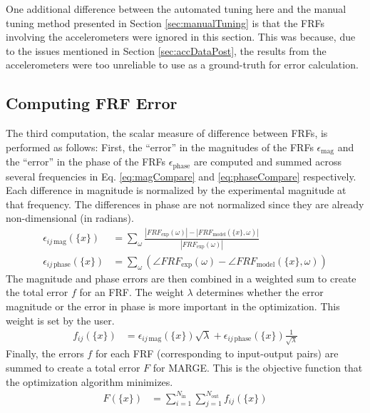 One additional difference between the automated tuning here and the manual tuning method presented in Section \ref{sec:manualTuning} is that the FRFs involving the accelerometers were ignored in this section. This was because, due to the issues mentioned in Section \ref{sec:accDataPost}, the results from the accelerometers were too unreliable to use as a ground-truth for error calculation.

\subsection{Computing FRF Error} %

The third computation, the scalar measure of difference between FRFs, is performed as follows:
First, the ``error'' in the magnitudes of the FRFs $\epsilon_\text{mag}$ and the ``error'' in the phase of the FRFs $\epsilon_\text{phase}$ are computed and summed across several frequencies in Eq. \ref{eq:magCompare} and \ref{eq:phaseCompare} respectively. Each difference in magnitude is normalized by the experimental magnitude at that frequency. The differences in phase are not normalized since they are already non-dimensional (in radians).
\begin{align}
	\label{eq:magCompare}
	\epsilon_{ij \, \text{mag}}(\{x\}) &= \sum_\omega \frac{|FRF_\text{exp} (\omega)| - |FRF_\text{model}(\{x\},\omega)|}{|FRF_\text{exp} (\omega)|} \\
	\label{eq:phaseCompare}
	\epsilon_{ij \, \text{phase}}(\{x\}) &= \sum_\omega \left( \angle FRF_\text{exp} (\omega) - \angle FRF_\text{model}(\{x\},\omega) \right)
\end{align}
The magnitude and phase errors are then combined in a weighted sum to create the total error $f$ for an FRF. The weight $\lambda$ determines whether the error magnitude or the error in phase is more important in the optimization. This weight is set by the user.
\begin{align}
	f_{ij}(\{x\}) &= \epsilon_{ij \, \text{mag}}(\{x\}) \sqrt{\lambda} + \epsilon_{ij \, \text{phase}}(\{x\}) \frac{1}{\sqrt{\lambda}}
\end{align}
Finally, the errors $f$ for each FRF (corresponding to input-output pairs) are summed to create a total error $F$ for MARGE. This is the objective function that the optimization algorithm minimizes.
\begin{align}
	F(\{x\}) &= \sum_{i=1}^{N_\text{in}} \sum_{j=1}^{N_\text{out}} f_{ij}(\{x\})
\end{align}

